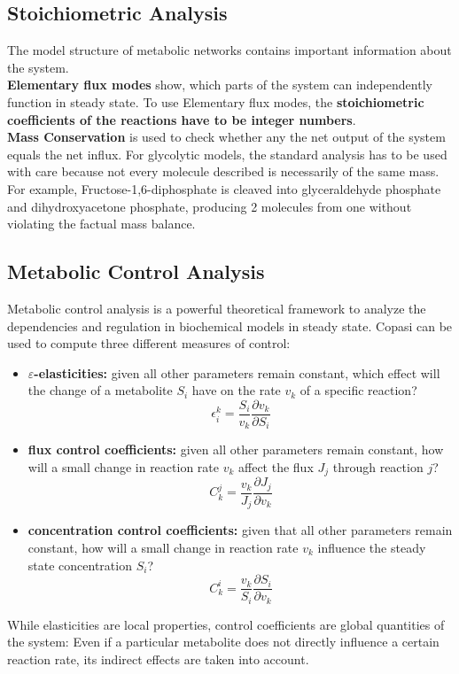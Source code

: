 \documentclass[a4paper,11pt,twoside]{article}
\begin{document}
\subsection{Stoichiometric Analysis}
\label{sub:sa}
The model structure of metabolic networks contains important information about the system.\\
\textbf{Elementary flux modes} show, which parts of the system can independently function in steady state. To use Elementary flux modes, the \textbf{stoichiometric coefficients of the reactions have to be integer numbers}.\\
\textbf{Mass Conservation} is used to check whether any the net output of the system equals the net influx. For glycolytic models, the standard analysis has to be used with care because not every molecule described  is  necessarily of  the  same  mass.  For  example, Fructose-1,6-diphosphate is cleaved into glyceraldehyde phosphate and dihydroxyacetone phosphate, producing 2 molecules from one without violating the factual mass balance.

\subsection{Metabolic Control Analysis}
\label{sub:mca}
Metabolic control analysis is a powerful theoretical framework to analyze the dependencies and regulation in biochemical models in steady state. Copasi can be used to compute three different measures of control:
\begin{itemize}
\item \textbf{$\varepsilon$-elasticities:} given all other parameters  remain constant, which effect will the change of a metabolite $S_i$ have  on the rate $v_k$ of a specific reaction?
\begin{equation*}
\epsilon_i^k = \frac{S_i}{v_k}\frac{\partial v_k}{\partial S_i}
\end{equation*}

\item \textbf{flux control coefficients:} given all other parameters  remain constant, how will a small change in reaction rate $v_k$ affect  the flux $J_j$ through reaction $j$?
 \begin{equation*}
 C_k^j = \frac{v_k}{J_j}\frac{\partial J_j}{\partial v_k}
 \end{equation*} 

\item \textbf{concentration control coefficients:} given that all  other parameters remain constant, how will a small change in reaction rate $v_k$ influence the steady state concentration $S_i$?
 \begin{equation*}
 C_k^i = \frac{v_k}{S_i}\frac{\partial S_i}{\partial v_k}
 \end{equation*} 
\end{itemize}
While elasticities are local properties, control coefficients are global quantities of the system: Even if a particular metabolite does not directly influence a certain reaction rate, its indirect effects are taken into account.
\end{document}
